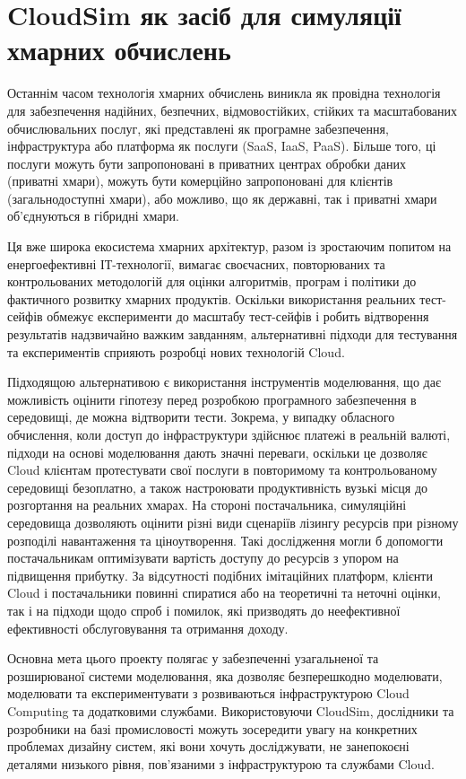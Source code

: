 \section{CloudSim як засіб для симуляції хмарних обчислень}

Останнім часом технологія хмарних обчислень виникла як провідна технологія для забезпечення надійних, безпечних, відмовостійких, стійких та масштабованих обчислювальних послуг, які представлені як програмне забезпечення, інфраструктура або платформа як послуги (SaaS, IaaS, PaaS). Більше того, ці послуги можуть бути запропоновані в приватних центрах обробки даних (приватні хмари), можуть бути комерційно запропоновані для клієнтів (загальнодоступні хмари), або можливо, що як державні, так і приватні хмари об'єднуються в гібридні хмари.

Ця вже широка екосистема хмарних архітектур, разом із зростаючим попитом на енергоефективні ІТ-технології, вимагає своєчасних, повторюваних та контрольованих методологій для оцінки алгоритмів, програм і політики до фактичного розвитку хмарних продуктів. Оскільки використання реальних тест-сейфів обмежує експерименти до масштабу тест-сейфів і робить відтворення результатів надзвичайно важким завданням, альтернативні підходи для тестування та експериментів сприяють розробці нових технологій Cloud.

Підходящою альтернативою є використання інструментів моделювання, що дає можливість оцінити гіпотезу перед розробкою програмного забезпечення в середовищі, де можна відтворити тести. Зокрема, у випадку обласного обчислення, коли доступ до інфраструктури здійснює платежі в реальній валюті, підходи на основі моделювання дають значні переваги, оскільки це дозволяє Cloud клієнтам протестувати свої послуги в повторимому та контрольованому середовищі безоплатно, а також настроювати продуктивність вузькі місця до розгортання на реальних хмарах. На стороні постачальника, симуляційні середовища дозволяють оцінити різні види сценаріїв лізингу ресурсів при різному розподілі навантаження та ціноутворення. Такі дослідження могли б допомогти постачальникам оптимізувати вартість доступу до ресурсів з упором на підвищення прибутку. За відсутності подібних імітаційних платформ, клієнти Cloud і постачальники повинні спиратися або на теоретичні та неточні оцінки, так і на підходи щодо спроб і помилок, які призводять до неефективної ефективності обслуговування та отримання доходу.

Основна мета цього проекту полягає у забезпеченні узагальненої та розширюваної системи моделювання, яка дозволяє безперешкодно моделювати, моделювати та експериментувати з розвиваються інфраструктурою Cloud Computing та додатковими службами. Використовуючи CloudSim, дослідники та розробники на базі промисловості можуть зосередити увагу на конкретних проблемах дизайну систем, які вони хочуть досліджувати, не занепокоєні деталями низького рівня, пов'язаними з інфраструктурою та службами Cloud.

